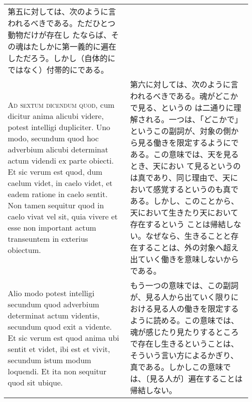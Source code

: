 \documentclass[10pt]{jsarticle} %
\begin{document}
\begin{longtable}{p{21em}p{21em}}
第五に対しては、次のように言われるべきである。ただひとつ動物だけが存在し
 たならば、その魂はたしかに第一義的に遍在しただろう。しかし（自体的に
 ではなく）付帯的にである。

\\


{\scshape Ad sextum dicendum quod}, cum dicitur anima alicubi videre, potest
 intelligi dupliciter. Uno modo, secundum quod hoc adverbium alicubi
 determinat actum videndi ex parte obiecti. Et sic verum est quod, dum
 caelum videt, in caelo videt, et eadem ratione in caelo sentit. Non
 tamen sequitur quod in caelo vivat vel sit, quia vivere et esse non
 important actum transeuntem in exterius obiectum. 

&


第六に対しては、次のように言われるべきである。魂がどこかで見る、というの
 は二通りに理解される。一つは、「どこかで」というこの副詞が、対象の側か
 ら見る働きを限定するようにである。この意味では、天を見るとき、天におい
 て見るというのは真であり、同じ理由で、天において感覚するというのも真で
 ある。しかし、このことから、天において生きたり天において存在するという
 ことは帰結しない。なぜなら、生きることと存在することは、外の対象へ超え
 出ていく働きを意味しないからである。

\\


Alio modo potest intelligi secundum quod adverbium determinat actum
 videntis, secundum quod exit a vidente. Et sic verum est quod anima ubi
 sentit et videt, ibi est et vivit, secundum istum modum loquendi. Et
 ita non sequitur quod sit ubique.

&

もう一つの意味では、この副詞が、見る人から出ていく限りにおける見る人の働きを限定するように読める。この意味では、魂が感じたり見たりするところで存在し生きるということは、そういう言い方によるかぎり、真である。しかしこの意味では、〔見る人が〕遍在することは帰結しない。


\end{longtable}
\end{document}
